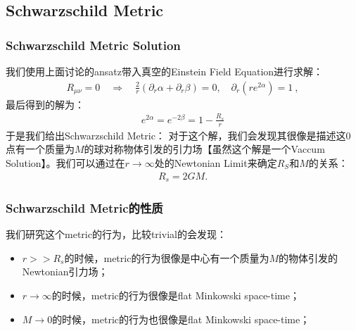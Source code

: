 \subsection{Schwarzschild Metric}

\subsubsection{Schwarzschild Metric Solution}

\bigskip
{}

我们使用上面讨论的ansatz带入真空的Einstein Field Equation进行求解：
\begin{align}
  R_{\mu\nu} = 0 \quad
  \Rightarrow \quad \frac{2}{r}(\partial_r\alpha+\partial_r\beta) = 0
  , \quad \partial_r\left(re^{2\alpha}\right)=1\mathrm{~,}
\end{align}
最后得到的解为：
\begin{align}
  e^{2 \alpha} = e^{-2 \beta} = 1-\frac{R_s}{r}
\end{align}
于是我们给出Schwarzschild Metric：
对于这个解，我们会发现其很像是描述这0点有一个质量为$ M $的球对称物体引发的引力场【虽然这个解是一个Vaccum
Solution】。我们可以通过在$ r\to\infty $处的Newtonian Limit来确定$ R_S $和$ M $的关系：
\begin{align}
  R_s = 2GM.
\end{align}

\subsubsection{Schwarzschild Metric的性质}

\bigskip
{}

我们研究这个metric的行为，比较trivial的会发现：
\begin{itemize}
  \item $ r >> R_s $的时候，metric的行为很像是中心有一个质量为$ M $的物体引发的Newtonian引力场；
  \item $ r \to \infty $的时候，metric的行为很像是flat Minkowski space-time；
  \item $ M \to 0 $的时候，metric的行为也很像是flat Minkowski space-time；
\end{itemize}

